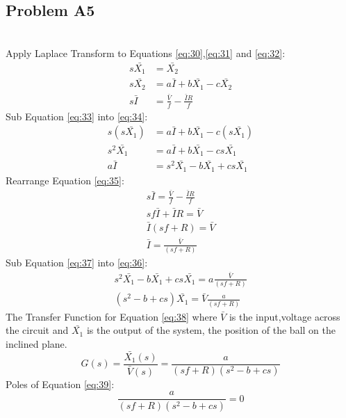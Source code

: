 \subsection*{Problem A5} 
    \hfill \break \\
Apply Laplace Transform to Equations \eqref{eq:30},\eqref{eq:31} and \eqref{eq:32}:
\begin{align}
    s\bar{X_1} &= \bar{X_2} \label{eq:33}\\
    s\bar{X_2} &= a\bar{I} + b\bar{X_1} - c\bar{X_2}\label{eq:34} \\
    s\bar{I} &= \frac{\bar{V}}{f} - \frac{\bar{I}R}{f}\label{eq:35}
\end{align}
Sub Equation \eqref{eq:33} into \eqref{eq:34}:\\
\begin{align}
     s(s\bar{X_1}) &= a\bar{I} + b\bar{X_1} - c(s\bar{X_1})\nonumber \\
     s^2\bar{X_1} &= a\bar{I} + b\bar{X_1} - cs\bar{X_1}\nonumber \\
     a\bar{I} &= s^2\bar{X_1} - b\bar{X_1} + cs\bar{X_1}   \label{eq:36}
\end{align}
Rearrange Equation \eqref{eq:35}:\\
\begin{align}
     s\bar{I} = \frac{\bar{V}}{f} - \frac{\bar{I}R}{f}\nonumber \\
     sf\bar{I}+ \bar{I}R = \bar{V} \nonumber \\
     \bar{I}(sf+ R) = \bar{V} \nonumber \\
     \bar{I} = \frac{\bar{V}}{(sf+ R)} \label{eq:37}
\end{align}
Sub Equation \eqref{eq:37} into \eqref{eq:36}:\\
\begin{align}
    s^2\bar{X_1} - b\bar{X_1} + cs\bar{X_1} = a\frac{\bar{V}}{(sf+ R)} \nonumber \\
     (s^2 - b + cs)\bar{X_1} = \bar{V}\frac{a}{(sf+ R)} \label{eq:38}
\end{align}
The Transfer Function for Equation \eqref{eq:38} where $\bar{V}$ is the input,voltage across the circuit and $\bar{X_1}$ is the output of the system, the position of the ball on the inclined plane. 
\begin{equation}\label{eq:39}
G(s) = \frac{\bar{X_1}(s)}{\bar{V}(s)} = \frac{a}{(sf+R)(s^2 - b + cs)}
\end{equation}
Poles of Equation \eqref{eq:39}:
\begin{equation} \nonumber
    \frac{a}{(sf+R)(s^2 - b + cs)} = 0
\end{equation}
